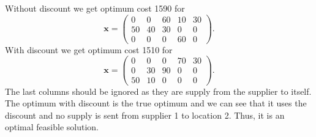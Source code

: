 \documentclass[a4paper]{article}
\begin{document}
Without discount we get optimum cost 1590 for
$$\mathbf{x} = 
\left(
\begin{array}{ccccc}
0 & 0 & 60 & 10 & 30\\
50 & 40 & 30 & 0 & 0\\
0 & 0 & 0 & 60 & 0
\end{array}
\right).
$$
With discount we get optimum cost 1510 for 
$$\mathbf{x} = 
\left(
\begin{array}{ccccc}
0 & 0 & 0 & 70 & 30\\
0 & 30 & 90 & 0 & 0\\
50 & 10 & 0 & 0 & 0
\end{array}
\right).
$$
The last columns should be ignored as they are supply from the supplier to itself. The optimum with discount is the true optimum and we can see that it uses the discount and no supply is sent from supplier 1 to location 2. Thus, it is an optimal feasible solution.
\end{document}
